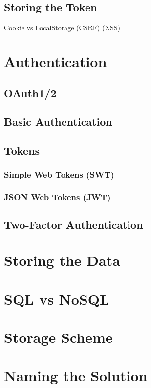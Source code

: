 		\subsection{Storing the Token}
			Cookie vs LocalStorage
			(CSRF)      (XSS)

	\section{Authentication}
		\subsection{OAuth1/2}
		\subsection{Basic Authentication}
		\subsection{Tokens}
			\subsubsection{Simple Web Tokens (SWT)}
			\subsubsection{JSON Web Tokens (JWT)}
		
		\subsection{Two-Factor Authentication}

	\section{Storing the Data}
		\section{SQL vs NoSQL}
	\section{Storage Scheme}

	\section{Naming the Solution}

